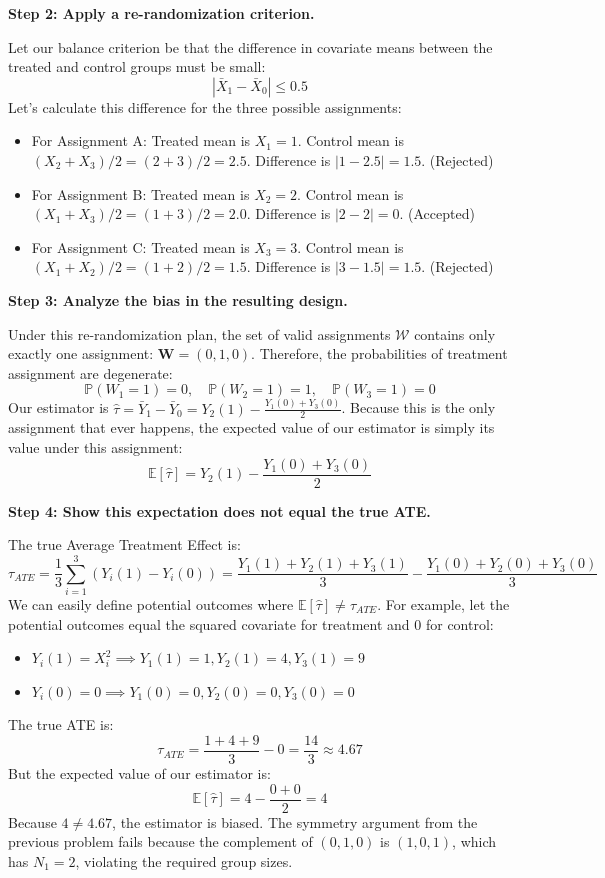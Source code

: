 \begin{solution}
\textbf{Step 2: Apply a re-randomization criterion.}

Let our balance criterion be that the difference in covariate means between the treated and control groups must be small:
\[ |\bar{X}_1 - \bar{X}_0| \leq 0.5 \]
Let's calculate this difference for the three possible assignments:
\begin{itemize}
    \item For Assignment A: Treated mean is $X_1 = 1$. Control mean is $(X_2 + X_3)/2 = (2+3)/2 = 2.5$. Difference is $|1 - 2.5| = 1.5$. (Rejected)
    \item For Assignment B: Treated mean is $X_2 = 2$. Control mean is $(X_1 + X_3)/2 = (1+3)/2 = 2.0$. Difference is $|2 - 2| = 0$. (Accepted)
    \item For Assignment C: Treated mean is $X_3 = 3$. Control mean is $(X_1 + X_2)/2 = (1+2)/2 = 1.5$. Difference is $|3 - 1.5| = 1.5$. (Rejected)
\end{itemize}

\textbf{Step 3: Analyze the bias in the resulting design.}

Under this re-randomization plan, the set of valid assignments $\mathcal{W}$ contains only exactly one assignment: $\mathbf{W} = (0, 1, 0)$.
Therefore, the probabilities of treatment assignment are degenerate:
\[ \mathbb{P}(W_1 = 1) = 0, \quad \mathbb{P}(W_2 = 1) = 1, \quad \mathbb{P}(W_3 = 1) = 0 \]
Our estimator is $\hat{\tau} = \bar{Y}_1 - \bar{Y}_0 = Y_2(1) - \frac{Y_1(0) + Y_3(0)}{2}$.
Because this is the only assignment that ever happens, the expected value of our estimator is simply its value under this assignment:
\[ \mathbb{E}[\hat{\tau}] = Y_2(1) - \frac{Y_1(0) + Y_3(0)}{2} \]

\textbf{Step 4: Show this expectation does not equal the true ATE.}

The true Average Treatment Effect is:
\[ \tau_{ATE} = \frac{1}{3} \sum_{i=1}^3 (Y_i(1) - Y_i(0)) = \frac{Y_1(1) + Y_2(1) + Y_3(1)}{3} - \frac{Y_1(0) + Y_2(0) + Y_3(0)}{3} \]
We can easily define potential outcomes where $\mathbb{E}[\hat{\tau}] \neq \tau_{ATE}$.
For example, let the potential outcomes equal the squared covariate for treatment and 0 for control:
\begin{itemize}
    \item $Y_i(1) = X_i^2 \implies Y_1(1)=1, Y_2(1)=4, Y_3(1)=9$
    \item $Y_i(0) = 0 \implies Y_1(0)=0, Y_2(0)=0, Y_3(0)=0$
\end{itemize}

The true ATE is:
\[ \tau_{ATE} = \frac{1+4+9}{3} - 0 = \frac{14}{3} \approx 4.67 \]
But the expected value of our estimator is:
\[ \mathbb{E}[\hat{\tau}] = 4 - \frac{0 + 0}{2} = 4 \]
Because $4 \neq 4.67$, the estimator is biased. The symmetry argument from the previous problem fails because the complement of $(0, 1, 0)$ is $(1, 0, 1)$, which has $N_1=2$, violating the required group sizes.
\end{solution}
